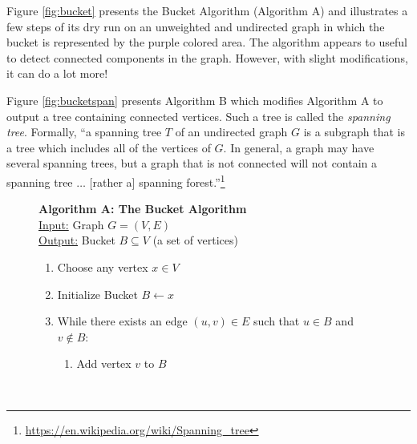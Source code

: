 \documentclass[a4paper]{exam}
\begin{document}
\begin{questions}



  Figure \ref{fig:bucket} presents the Bucket Algorithm (Algorithm A) and illustrates a few steps of its dry run on an unweighted and undirected graph in which the bucket is represented by the purple colored area. The algorithm appears to useful to detect connected components in the graph. However, with slight modifications, it can do a lot more!

  Figure \ref{fig:bucketspan} presents Algorithm B which modifies Algorithm A to output a tree containing connected vertices. Such a tree is called the \textit{spanning tree}. Formally, ``a spanning tree $T$ of an undirected graph $G$ is a subgraph that is a tree which includes all of the vertices of $G$. In general, a graph may have several spanning trees, but a graph that is not connected will not contain a spanning tree $\ldots$ [rather a] spanning forest.''\footnote{\url{https://en.wikipedia.org/wiki/Spanning_tree}}
  
  \begin{figure}
    \begin{center}
    \begin{minipage}{.8\textwidth}
    \textbf{Algorithm A: The Bucket Algorithm}\\
    \underline{Input:} Graph $G = (V, E)$\\
    \underline{Output:} Bucket $B \subseteq V$ (a set of vertices)

    \begin{enumerate}
    \item Choose any vertex $x \in V$
    \item Initialize Bucket $B \leftarrow x$
    \item While there exists an edge $(u, v) \in E$ such that $u \in B$ and $v \not\in B$:
      \begin{enumerate}
      \item Add vertex $v$ to $B$
      \end{enumerate}
    \end{enumerate}
  \end{minipage}\\[5pt]


\end{center}
\end{figure}
\end{questions}
\end{document}
